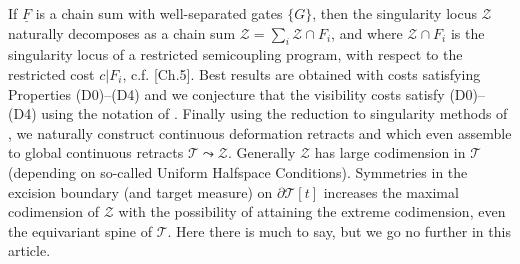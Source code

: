 \documentclass[12pt]{amsart}
\theoremstyle{definition}
\theoremstyle{remark}
\newcommand{\bZ}{\mathbb{Z}}
\newcommand{\del}{\partial}
\newcommand{\uF}{\underline{F}}
\newcommand{\sT}{\mathscr{T}}
\newcommand{\sZ}{\mathscr{Z}}
\begin{document}
If $\uF$ is a chain sum with well-separated gates $\{G\}$, then the singularity locus $\sZ$ naturally decomposes as a chain sum $\sZ=\sum_i \sZ \cap F_i$, and where $\sZ \cap F_i$ is the singularity locus of a restricted semicoupling program, with respect to the restricted cost $c|F_i$, c.f. \cite{martel}[Ch.5]. Best results are obtained with costs satisfying Properties (D0)--(D4) and we conjecture that the visibility costs satisfy (D0)--(D4) using the notation of \cite{martel}. Finally using the reduction to singularity methods of \cite{martel}, we naturally construct continuous deformation retracts and which even assemble to global continuous retracts $\sT \leadsto \sZ$. Generally $\sZ$ has large codimension in $\sT$ (depending on so-called Uniform Halfspace Conditions). Symmetries in the excision boundary (and target measure) on $\del \sT[t]$ increases the maximal codimension of $\sZ$ with the possibility of attaining the extreme codimension, even the equivariant spine of $\sT$. Here there is much to say, but we go no further in this article.






 
\end{document}
